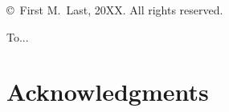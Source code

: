 \theoremstyle{mystyle}
\newtheorem{thm}[theorem]{Theorem}

\theoremstyle{mystyle}
\newtheorem{defn}[theorem]{Definition}

\theoremstyle{mystyle}
\newtheorem{fact}[theorem]{Fact}

\theoremstyle{mystyle}
\newtheorem{prop}[theorem]{Proposition}

\theoremstyle{mystyle}
\newtheorem{lem}[theorem]{Lemma}



\theoremstyle{mystyle}
\newtheorem{example}[theorem]{Example}

\captionsetup[subfigure]{labelfont=rm}

\setcounter{tocdepth}{2}


   \frontmatter

   \pagestyle{prelim}
   
   
   \newpage
	
	 \thispagestyle{empty}
	 \begin{titlepage}
	 \vspace*{50em}
	 \begin{center}
		 \copyright \ First M.\ Last, 20XX.  All rights reserved.  
	 \end{center}
	 \end{titlepage}
	 \newpage
	
	 \thispagestyle{empty}
	 \vspace*{20em}
	 \begin{center}
	   To...
	 \end{center}
	 \newpage
   
   \doublespacing
   
   \tableofcontents
   \newpage
   
   
   \newpage
   
   \section*{Acknowledgments}
   
   
